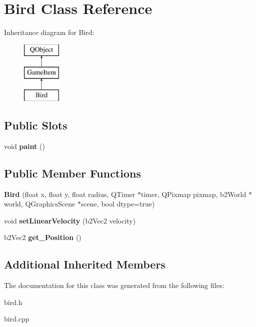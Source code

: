 \hypertarget{classBird}{\section{Bird Class Reference}
\label{classBird}
}
Inheritance diagram for Bird\-:\begin{figure}[H]
\begin{center}
\leavevmode
\includegraphics[height=3.000000cm]{classBird}
\end{center}
\end{figure}
\subsection*{Public Slots}
\begin{DoxyCompactItemize}
\item 
\hypertarget{classBird_a2840e2e74ef059b11043ce7306ed7a25}{void {\bfseries paint} ()}\label{classBird_a2840e2e74ef059b11043ce7306ed7a25}

\end{DoxyCompactItemize}
\subsection*{Public Member Functions}
\begin{DoxyCompactItemize}
\item 
\hypertarget{classBird_ac323f5c2088454395569e8580d7c9a41}{{\bfseries Bird} (float x, float y, float radius, Q\-Timer $\ast$timer, Q\-Pixmap pixmap, b2\-World $\ast$world, Q\-Graphics\-Scene $\ast$scene, bool dtype=true)}\label{classBird_ac323f5c2088454395569e8580d7c9a41}

\item 
\hypertarget{classBird_a30a2480db9cbbbc498ab3ce651e579d8}{void {\bfseries set\-Linear\-Velocity} (b2\-Vec2 velocity)}\label{classBird_a30a2480db9cbbbc498ab3ce651e579d8}

\item 
\hypertarget{classBird_ac24711e054b0af39d40aa4ecd8b7e477}{b2\-Vec2 {\bfseries get\-\_\-\-Position} ()}\label{classBird_ac24711e054b0af39d40aa4ecd8b7e477}

\end{DoxyCompactItemize}
\subsection*{Additional Inherited Members}


The documentation for this class was generated from the following files\-:\begin{DoxyCompactItemize}
\item 
bird.\-h\item 
bird.\-cpp\end{DoxyCompactItemize}
